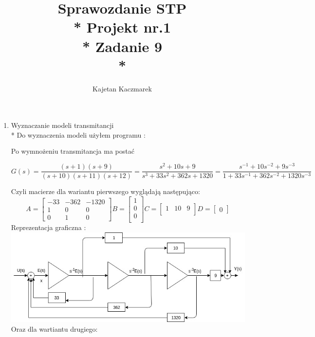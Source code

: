 \documentclass[a4paper, 11pt]{article}
\author{Kajetan Kaczmarek}
\begin{document}
\title{Sprawozdanie STP \\* Projekt nr.1 \\* 
Zadanie 9 \\*}
\maketitle
\begin{enumerate}
\item Wyznaczanie modeli transmitancji \\*
Do wyznaczenia modeli użyłem programu : 

Po wymnożeniu transmitancja ma postać 
\begin{center} \[ G(s) = \dfrac{(s + 1)(s + 9)}{(s + 10)(s + 11)(s + 12)} = \dfrac{s^2 + 10s + 9}{s^3 + 33s^2 + 362s + 1320} = \dfrac{s^{-1} + 10s^{-2} + 9s^{-3}}{1 + 33s^{-1} + 362s^{-2} + 1320s^{-3}} \]
\end{center}
Czyli macierze dla wariantu pierwszego wyglądają następująco:
 \[ A = 	
 \begin{bmatrix}
   -33 & -362 & -1320\\
   1 & 0 & 0\\
   0 & 1 & 0
  \end{bmatrix}
B = 
\begin{bmatrix}
	1 \\
	0 \\
	0 \\
\end{bmatrix}
C = 
\begin{bmatrix}
	1 & 10 & 9 \\
\end{bmatrix}
D = \begin{bmatrix}
0 \end{bmatrix}
 \]
Reprezentacja graficzna : 
\includegraphics[scale=0.5]{Wariant1.jpg}
Oraz dla wartiantu drugiego:


\end{enumerate}
\end{document}
